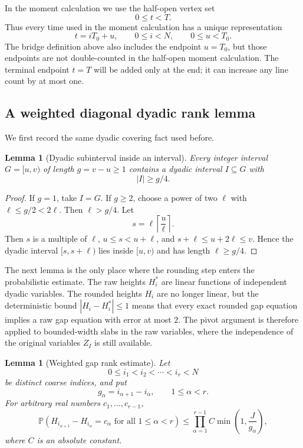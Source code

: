 \documentclass[11pt]{article}
\newtheorem{lemma}[theorem]{Lemma}
\theoremstyle{definition}
\theoremstyle{remark}
\newcommand{\Pp}{\mathbb P}
\newcommand{\1}{\mathbf 1}
\begin{document}
\bigskip
\noindent
In the moment calculation we use the half-open vertex set
\[
0\le t<T.
\]
Thus every time used in the moment calculation has a unique representation
\[
t=iT_0+u,
\qquad 0\le i<N,
\qquad 0\le u<T_0.
\]
The bridge definition above also includes the endpoint $u=T_0$, but those endpoints are not double-counted in the half-open moment calculation.  The terminal endpoint $t=T$ will be added only at the end; it can increase any line count by at most one.

\subsection{A weighted diagonal dyadic rank lemma}

We first record the same dyadic covering fact used before.

\begin{lemma}[Dyadic subinterval inside an interval]\label{lem:dyadic_subinterval}
Every integer interval $G=[u,v)$ of length $g=v-u\ge1$ contains a dyadic interval $I\subseteq G$ with
\[
|I|\ge g/4.
\]
\end{lemma}

\begin{proof}
If $g=1$, take $I=G$.  If $g\ge2$, choose a power of two $\ell$ with $\ell\le g/2<2\ell$.  Then $\ell>g/4$.  Let
\[
s=\ell\left\lceil\frac{u}{\ell}\right\rceil.
\]
Then $s$ is a multiple of $\ell$, $u\le s<u+\ell$, and $s+\ell\le u+2\ell\le v$.  Hence the dyadic interval $[s,s+\ell)$ lies inside $[u,v)$ and has length $\ell\ge g/4$.
\end{proof}

\smallskip
\noindent
The next lemma is the only place where the rounding step enters the probabilistic estimate.  The raw heights $H_i^*$ are linear functions of independent dyadic variables.  The rounded heights $H_i$ are no longer linear, but the deterministic bound $|H_i-H_i^*|\le1$ means that every exact rounded gap equation implies a raw gap equation with error at most $2$.  The pivot argument is therefore applied to bounded-width slabs in the raw variables, where the independence of the original variables $Z_I$ is still available.

\begin{lemma}[Weighted gap rank estimate]\label{lem:gap_rank}
Let
\[
0\le i_1<i_2<\cdots<i_r<N
\]
be distinct coarse indices, and put
\[
g_\alpha=i_{\alpha+1}-i_\alpha,
\qquad 1\le\alpha<r.
\]
For arbitrary real numbers $c_1,\ldots,c_{r-1}$,
\[
\Pp\left(
H_{i_{\alpha+1}}-H_{i_\alpha}=c_\alpha
\text{ for all }1\le\alpha<r
\right)
\le
\prod_{\alpha=1}^{r-1} C\min\left(1,\frac{J}{g_\alpha}\right),
\]
where $C$ is an absolute constant.
\end{lemma}
\end{document}
